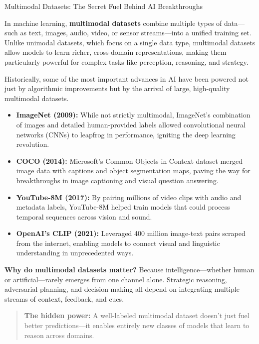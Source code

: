 \begin{HistoricalSidebar}{Multimodal Datasets: The Secret Fuel Behind AI Breakthroughs}

    In machine learning, \textbf{multimodal datasets} combine multiple types of data—such as text, images, audio, video, or sensor streams—into a unified training set. Unlike unimodal datasets, which focus on a single data type, multimodal datasets allow models to learn richer, cross-domain representations, making them particularly powerful for complex tasks like perception, reasoning, and strategy.
    
    \medskip
    
    Historically, some of the most important advances in AI have been powered not just by algorithmic improvements but by the arrival of large, high-quality multimodal datasets.
    
    \begin{itemize}
    \item \textbf{ImageNet (2009):} While not strictly multimodal, ImageNet’s combination of images and detailed human-provided labels allowed convolutional neural networks (CNNs) to leapfrog in performance, igniting the deep learning revolution.
    \item \textbf{COCO (2014):} Microsoft’s Common Objects in Context dataset merged image data with captions and object segmentation maps, paving the way for breakthroughs in image captioning and visual question answering.
    \item \textbf{YouTube-8M (2017):} By pairing millions of video clips with audio and metadata labels, YouTube-8M helped train models that could process temporal sequences across vision and sound.
    \item \textbf{OpenAI’s CLIP (2021):} Leveraged 400 million image-text pairs scraped from the internet, enabling models to connect visual and linguistic understanding in unprecedented ways.
    \end{itemize}
    
    \medskip
    
    \textbf{Why do multimodal datasets matter?}
    Because intelligence—whether human or artificial—rarely emerges from one channel alone. Strategic reasoning, adversarial planning, and decision-making all depend on integrating multiple streams of context, feedback, and cues.
    
    \medskip
    
    \begin{quote}
    \textbf{The hidden power:} A well-labeled multimodal dataset doesn’t just fuel better predictions—it enables entirely new classes of models that learn to reason across domains.
    \end{quote}
    

\end{HistoricalSidebar}
